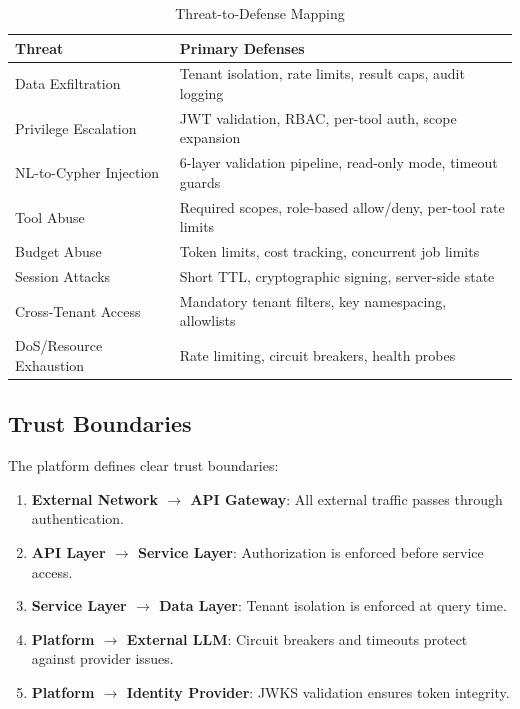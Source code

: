 \begin{table}[ht]
\centering
\caption{Threat-to-Defense Mapping}
\label{tab:threat-defense-mapping}
\small
\begin{tabular}{lp{7cm}}
\hline
\textbf{Threat} & \textbf{Primary Defenses} \\
\hline
Data Exfiltration & Tenant isolation, rate limits, result caps, audit logging \\
Privilege Escalation & JWT validation, RBAC, per-tool auth, scope expansion \\
NL-to-Cypher Injection & 6-layer validation pipeline, read-only mode, timeout guards \\
Tool Abuse & Required scopes, role-based allow/deny, per-tool rate limits \\
Budget Abuse & Token limits, cost tracking, concurrent job limits \\
Session Attacks & Short TTL, cryptographic signing, server-side state \\
Cross-Tenant Access & Mandatory tenant filters, key namespacing, allowlists \\
DoS/Resource Exhaustion & Rate limiting, circuit breakers, health probes \\
\hline
\end{tabular}
\end{table}

\subsection{Trust Boundaries}
\label{subsec:trust-boundaries}

The platform defines clear trust boundaries:

\begin{enumerate}
    \item \textbf{External Network $\rightarrow$ API Gateway}: All external traffic passes through authentication.
    \item \textbf{API Layer $\rightarrow$ Service Layer}: Authorization is enforced before service access.
    \item \textbf{Service Layer $\rightarrow$ Data Layer}: Tenant isolation is enforced at query time.
    \item \textbf{Platform $\rightarrow$ External LLM}: Circuit breakers and timeouts protect against provider issues.
    \item \textbf{Platform $\rightarrow$ Identity Provider}: JWKS validation ensures token integrity.
\end{enumerate}

